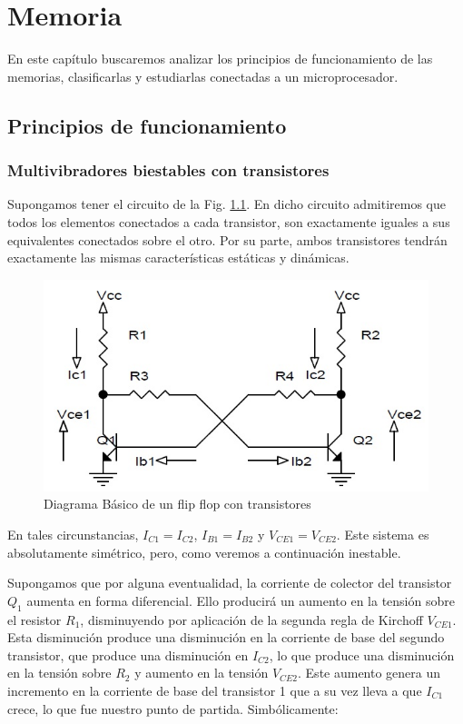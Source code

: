 \documentclass[12pt]{book}
\theoremstyle{definition}
\theoremstyle{remark}
\theoremstyle{plain}
\begin{document}
\chapter{Memoria}
En este capítulo buscaremos analizar los principios de funcionamiento de las memorias, clasificarlas y estudiarlas conectadas a un microprocesador.

\section{Principios de funcionamiento}

\subsection{Multivibradores biestables con transistores}

Supongamos tener el circuito de la Fig. \ref{fig5}. En dicho circuito admitiremos que todos los elementos conectados a cada transistor, son exactamente iguales a sus equivalentes conectados sobre el otro. Por su parte, ambos transistores tendrán exactamente las mismas características estáticas y dinámicas.

\begin{figure}
\centering
\includegraphics[width=5in]{Biestable.jpg}
\caption{Diagrama Básico de un flip flop con transistores}
\label{fig5}
\end{figure}

En tales circunstancias, $I_{C1} = I_{C2}$, $I_{B1} = I_{B2}$ y $V_{CE1} = V_{CE2}$.
Este sistema es absolutamente simétrico, pero, como veremos a continuación inestable.

Supongamos que por alguna eventualidad, la corriente de colector del transistor $Q_{1}$ aumenta en forma diferencial. Ello producirá un aumento en la tensión sobre el resistor $R_1$, disminuyendo por aplicación de la segunda regla de Kirchoff $V_{CE1}$. Esta disminución produce una disminución en la corriente de base del segundo transistor, que produce una disminución en $I_{C2}$, lo que produce una disminución en la tensión sobre $R_2$ y aumento en la tensión $V_{CE2}$. Este aumento genera un incremento en la corriente de base del transistor 1 que a su vez lleva a que $I_{C1}$ crece, lo que fue nuestro punto de partida. Simbólicamente:
\end{document}
